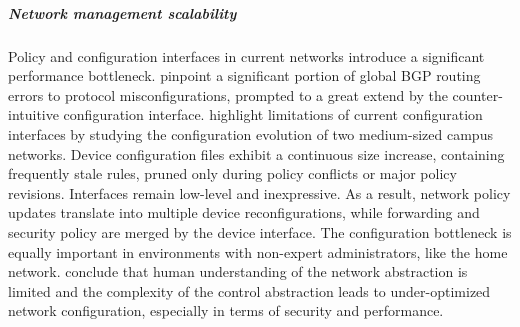 
\subparagraph{Network management scalability}

Policy and configuration interfaces in current networks introduce a significant
performance bottleneck.  \cite{Mahajan02} pinpoint a significant portion of
global BGP routing errors to protocol misconfigurations, prompted to a great
extend by the counter-intuitive configuration interface.  \cite{Kim11} highlight
limitations of current configuration interfaces by studying the configuration
evolution of two medium-sized campus networks.  Device configuration files
exhibit a continuous size increase, containing frequently stale rules, pruned
only during policy conflicts or major policy revisions.  Interfaces remain
low-level and inexpressive. As a result, network policy updates translate into
multiple device reconfigurations, while forwarding and security policy are
merged by the device interface. The configuration bottleneck is
equally important in environments with non-expert administrators, like the
home network.  \cite{grinter05} conclude that human understanding of the network
abstraction is limited and the complexity of the control abstraction leads to
under-optimized network configuration, especially  in terms of security and
performance. 

